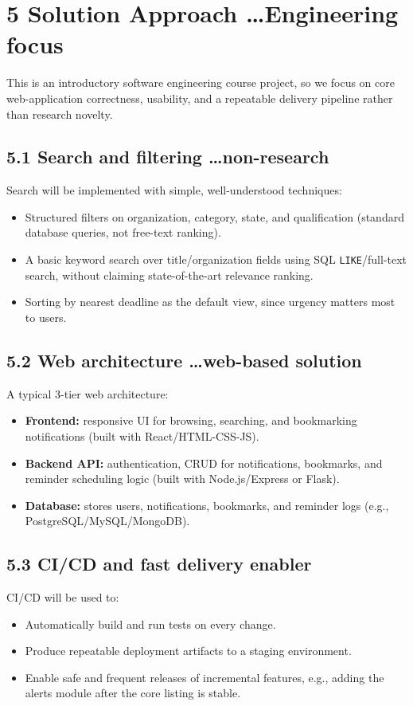 \documentclass[11pt,a4paper]{article}
\begin{document}
\section*{5 Solution Approach \dots Engineering focus}
This is an introductory software engineering course project, so we focus on core
web-application correctness, usability, and a repeatable delivery pipeline rather
than research novelty.

\subsection*{5.1 Search and filtering \dots non-research}
Search will be implemented with simple, well-understood techniques:
\begin{itemize}[leftmargin=1.5em]
  \item Structured filters on organization, category, state, and qualification
  (standard database queries, not free-text ranking).
  \item A basic keyword search over title/organization fields using SQL
  \texttt{LIKE}/full-text search, without claiming state-of-the-art relevance
  ranking.
  \item Sorting by nearest deadline as the default view, since urgency matters
  most to users.
\end{itemize}

\subsection*{5.2 Web architecture \dots web-based solution}
A typical 3-tier web architecture:
\begin{itemize}[leftmargin=1.5em]
  \item \textbf{Frontend:} responsive UI for browsing, searching, and bookmarking
  notifications (built with React/HTML-CSS-JS).
  \item \textbf{Backend API:} authentication, CRUD for notifications, bookmarks,
  and reminder scheduling logic (built with Node.js/Express or Flask).
  \item \textbf{Database:} stores users, notifications, bookmarks, and reminder
  logs (e.g., PostgreSQL/MySQL/MongoDB).
\end{itemize}

\subsection*{5.3 CI/CD and fast delivery enabler}
CI/CD will be used to:
\begin{itemize}[leftmargin=1.5em]
  \item Automatically build and run tests on every change.
  \item Produce repeatable deployment artifacts to a staging environment.
  \item Enable safe and frequent releases of incremental features, e.g., adding
  the alerts module after the core listing is stable.
\end{itemize}
\end{document}
